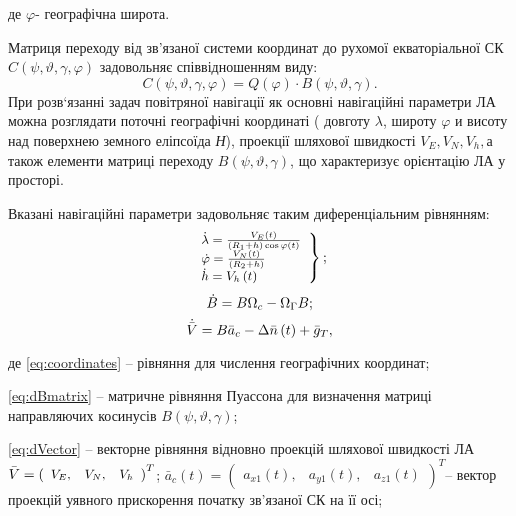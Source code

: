 де $\varphi $- географічна широта.

Матриця переходу від зв'язаної системи координат до рухомої екваторіальної СК $C(\psi ,\vartheta,\gamma ,\varphi)$ 
задовольняє співвідношенням виду:
\[C\left(\psi ,\vartheta ,\gamma ,\varphi \right)=
Q\left(\varphi \right)\cdot B\left(\psi ,\vartheta ,\gamma \right).\] 
При розв`язанні задач повітряної навігації як основні навігаційні параметри ЛА можна 
розглядати поточні географічні координаті ( довготу $\lambda $, широту $\varphi $ и 
висоту над поверхнею земного еліпсоїда \textit{Н}), проекції шляхової швидкості $V_{E} 
,V_{N} ,V_{h} ,$а також елементи матриці переходу $B\left(\psi ,\vartheta ,\gamma 
\right)$, що характеризує орієнтацію ЛА у просторі.

Вказані навігаційні параметри задовольняє таким диференціальним рівнянням:
\begin{equation} \small
\left .
\begin{array}{l} 
{\dot{\lambda }=
\frac{V_{E} \left(t\right)}{\left(R_{1}+h\right)\cos \varphi \left(t\right)} } \\ 
{\dot{\varphi }=\frac{V_{N} \left(t\right)}{\left(R_{2} +h\right)} } \\
{\dot{h}=V_{h} \left(t\right)} \end{array}\right\};
\label{eq:coordinates}
\end{equation}
\begin{equation} \small
\dot{B}=B\Omega_{c} -\Omega_{\Gamma}B ;               
\label{eq:dBmatrix}
\end{equation}
\begin{equation} \small
\dot{\bar{V}}=B\bar{a}_{c} -\Delta \bar{n}\left(t\right)+\bar{g}_{T} ,     
\label{eq:dVector}
\end{equation}
\begin{ESKDexplanation}
\item де \eqref{eq:coordinates} -- рівняння для числення географічних координат; 
\item \eqref{eq:dBmatrix} -- матричне рівняння Пуассона для визначення матриці 
направляючих косинусів $B\left(\psi ,\vartheta ,\gamma \right)$; 
\item \eqref{eq:dVector} -- векторне рівняння відновно 
проекцій шляхової швидкості ЛА 
$\small \bar{V}=\left(\begin{array}{ccc} {V_{E} ,} & {V_{N} 
,} & {V_{h} } \end{array}\right)^{T} $; $\bar{a}_{c} \left(t\right)=\left(\begin{array}{ccc} 
{a_{x1} \left(t\right),} & {a_{y1} \left(t\right),} & {a_{z1} \left(t\right)} \end{array}
\right)^{T} $-- вектор проекцій уявного прискорення початку зв'язаної СК на її осі;
\end{ESKDexplanation}
